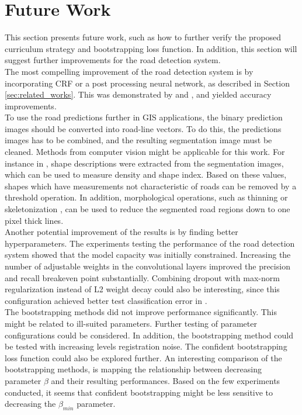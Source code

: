 \section{Future Work}
\label{sec:futureWork}
This section presents future work, such as how to further verify the proposed curriculum strategy and bootstrapping loss function. In addition, this section will suggest further improvements for the road detection system.\\

The most compelling improvement of the road detection system is by incorporating \ac{CRF} or a post processing neural network, as described in Section \ref{sec:related_works}. This was demonstrated by \cite{Kluckner_semantic_height} and \cite{Mnih_aerial_images_noisy}, and yielded accuracy improvements. \\

To use the road predictions further in GIS applications, the binary prediction images should be converted into road-line vectors. To do this, the predictions images has to be combined, and the resulting segmentation image must be cleaned. Methods from computer vision might be applicable for this work. For instance in \citep{Song_road_extraction_svm}, shape descriptions were extracted from the segmentation images, which can be used to measure density and shape index. Based on these values, shapes which have measurements not characteristic of roads can be removed by a threshold operation. In addition, morphological operations, such as thinning or skeletonization , can be used to reduce the segmented road regions down to one pixel thick lines.\\

Another potential improvement of the results is by finding better hyperparameters. The experiments testing the performance of the road detection system showed that the model capacity was initially constrained. Increasing the number of adjustable weights in the convolutional layers improved the precision and recall breakeven point substantially. Combining dropout with max-norm regularization instead of L2 weight decay could also be interesting, since this configuration achieved better test classification error in \citep{Srivastava_dropout}.\\

The bootstrapping methods did not improve performance significantly. This might be related to ill-suited parameters. Further testing of parameter configurations could be considered. In addition, the bootstrapping method could be tested with increasing levels registration noise. The confident bootstrapping loss function could also be explored further. An interesting comparison of the bootstrapping methods, is mapping the relationship between decreasing parameter $\beta$ and their resulting performances. Based on the few experiments conducted, it seems that confident bootstrapping might be less sensitive to decreasing the $\beta_{min}$ parameter.\\

